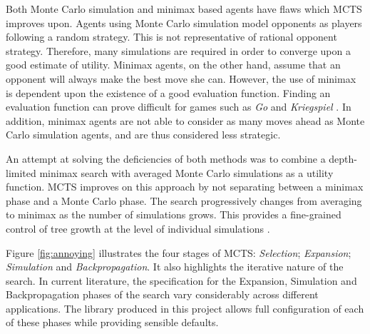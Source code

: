 Both {Monte Carlo simulation} and {minimax} based agents have flaws which {MCTS} improves upon.
Agents using {Monte Carlo simulation} model opponents as players following a random strategy. This is not representative of rational opponent strategy. Therefore, many simulations are required in order to converge upon a good estimate of utility. 
Minimax agents, on the other hand, assume that an opponent will always make the best move she can. However, the use of minimax is dependent upon the existence of a good evaluation function. Finding an evaluation function can prove difficult for games such as \textit{Go} \cite{go} and \textit{Kriegspiel} \cite{kriegspiel}. In addition, minimax agents are not able to consider as many moves ahead as Monte Carlo simulation agents, and are thus considered less strategic.



An attempt at solving the deficiencies of both methods was to combine a depth-limited {minimax} search with averaged Monte Carlo simulations as a utility function. MCTS improves on this approach by not separating between a {minimax} phase and a {Monte Carlo} phase. The search progressively changes from averaging to {minimax} as the number of simulations grows. This provides a fine-grained control of tree growth at the level of individual simulations \cite{firstmcts}. 

Figure \ref{fig:annoying} illustrates the four stages of {MCTS}: \textit{Selection}; \textit{Expansion}; \textit{Simulation} and \textit{Backpropagation}. It also highlights the iterative nature of the search. In current literature, the specification for the {Expansion}, {Simulation} and {Backpropagation} phases of the search vary considerably across different applications. The library produced in this project allows full configuration of each of these phases while providing sensible defaults. 


